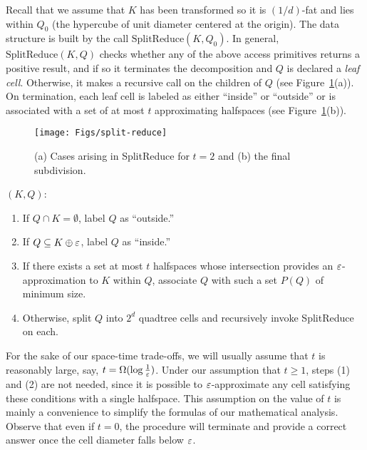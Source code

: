 \documentclass[11pt]{article}   \usepackage[letterpaper,hmargin=2.1cm,vmargin=3cm]{geometry}
\newcommand{\inv}[1]{\frac{1}{#1}}
\newcommand{\alg}{\textrm{SplitReduce}}
\begin{document}
Recall that we assume that $K$ has been transformed so it is $(1/d)$-fat and lies within $Q_0$ (the hypercube of unit diameter centered at the origin). The data structure is built by the call $\alg(K,Q_0)$. In general, $\alg(K,Q)$ checks whether any of the above access primitives returns a positive result, and if so it terminates the decomposition and $Q$ is declared a \emph{leaf cell}. Otherwise, it makes a recursive call on the children of $Q$ (see Figure~\ref{fig:split-reduce}(a)). On termination, each leaf cell is labeled as either ``inside'' or ``outside'' or is associated with a set of at most $t$ approximating halfspaces (see Figure~\ref{fig:split-reduce}(b)).

\begin{figure}[htbp]
  \centerline{\texttt{[image: Figs/split-reduce]}}
  \caption{(a) Cases arising in {\alg} for $t = 2$ and (b) the final subdivision.}
  \label{fig:split-reduce}
\end{figure}


\newcommand{\stepout}{1}  \newcommand{\stepin}{2}
\newcommand{\stepapx}{3}
\newcommand{\steprecur}{4}
\noindent{\alg}$(K,Q)$:
  \begin{enumerate}
\setlength{\itemsep}{-0.5ex}\setlength{\parsep}{0pt}\item[(\stepout)] If $Q \cap K = \emptyset$,  label $Q$ as ``outside.''
	
	\item[(\stepin)] If $Q \subseteq K \oplus \varepsilon$, label $Q$ as ``inside.''
  
	\item[(\stepapx)] If there exists a set at most $t$ halfspaces whose intersection provides an $\varepsilon$-approximation to $K$ within $Q$, associate $Q$ with such a set $P(Q)$ of minimum size.
	
  \item[(\steprecur)] Otherwise, split $Q$ into $2^d$ quadtree cells and recursively invoke {\alg} on each. 
\end{enumerate}


For the sake of our space-time trade-offs, we will usually assume that $t$ is reasonably large, say, $t = \Omega(\log \inv{\eps})$. Under our assumption that $t \ge 1$, steps (\stepout) and (\stepin) are not needed, since it is possible to $\varepsilon$-approximate any cell satisfying these conditions with a single halfspace. This assumption on the value of $t$ is mainly a convenience to simplify the formulas of our mathematical analysis. Observe that even if $t = 0$, the procedure will terminate and provide a correct answer once the cell diameter falls below $\varepsilon$.
\end{document}
